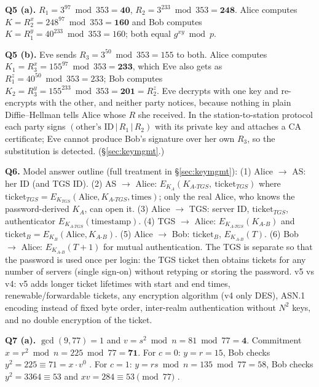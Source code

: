 \textbf{Q5 (a).} $R_1 = 3^{97} \bmod 353 = \mathbf{40}$, $R_2 = 3^{233} \bmod 353 = \mathbf{248}$. Alice computes $K = R_2^{x} = 248^{97} \bmod 353 = \mathbf{160}$ and Bob computes $K = R_1^{y} = 40^{233} \bmod 353 = 160$; both equal $g^{xy} \bmod p$.

\textbf{Q5 (b).} Eve sends $R_3 = 3^{50} \bmod 353 = 155$ to both. Alice computes $K_1 = R_3^{x} = 155^{97} \bmod 353 = \mathbf{233}$, which Eve also gets as $R_1^{z} = 40^{50} \bmod 353 = 233$; Bob computes $K_2 = R_3^{y} = 155^{233} \bmod 353 = \mathbf{201} = R_2^{z}$. Eve decrypts with one key and re-encrypts with the other, and neither party notices, because nothing in plain Diffie--Hellman tells Alice whose $R$ she received. In the station-to-station protocol each party signs $(\text{other's ID} \,|\, R_1 \,|\, R_2)$ with its private key and attaches a CA certificate; Eve cannot produce Bob's signature over her own $R_3$, so the substitution is detected. (\S\ref{sec:keymgmt}.)

\textbf{Q6.} Model answer outline (full treatment in \S\ref{sec:keymgmt}): (1) Alice $\to$ AS: her ID (and TGS ID). (2) AS $\to$ Alice: $E_{K_A}(K_{A\text{-}TGS},\ \text{ticket}_{TGS})$ where $\text{ticket}_{TGS} = E_{K_{TGS}}(\text{Alice}, K_{A\text{-}TGS}, \text{times})$; only the real Alice, who knows the password-derived $K_A$, can open it. (3) Alice $\to$ TGS: server ID, $\text{ticket}_{TGS}$, authenticator $E_{K_{A\text{-}TGS}}(\text{timestamp})$. (4) TGS $\to$ Alice: $E_{K_{A\text{-}TGS}}(K_{A\text{-}B})$ and $\text{ticket}_B = E_{K_B}(\text{Alice}, K_{A\text{-}B})$. (5) Alice $\to$ Bob: $\text{ticket}_B$, $E_{K_{A\text{-}B}}(T)$. (6) Bob $\to$ Alice: $E_{K_{A\text{-}B}}(T + 1)$ for mutual authentication. The TGS is separate so that the password is used once per login: the TGS ticket then obtains tickets for any number of servers (single sign-on) without retyping or storing the password. v5 vs v4: v5 adds longer ticket lifetimes with start and end times, renewable/forwardable tickets, any encryption algorithm (v4 only DES), ASN.1 encoding instead of fixed byte order, inter-realm authentication without $N^2$ keys, and no double encryption of the ticket.

\textbf{Q7 (a).} $\gcd(9, 77) = 1$ and $v = s^2 \bmod n = 81 \bmod 77 = \mathbf 4$. Commitment $x = r^2 \bmod n = 225 \bmod 77 = \mathbf{71}$.
For $c = 0$: $y = r = 15$, Bob checks $y^2 = 225 \equiv 71 = x \cdot v^0$ \checkmark.
For $c = 1$: $y = r s \bmod n = 135 \bmod 77 = 58$, Bob checks $y^2 = 3364 \equiv 53$ and $x v = 284 \equiv 53 \pmod{77}$ \checkmark.

